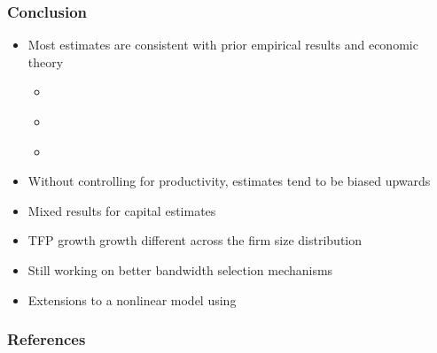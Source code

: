 \documentclass{beamer}
\begin{document}
\begin{frame}
\frametitle{Conclusion}
\begin{itemize}
	\item Most estimates are consistent with prior empirical results and economic theory
		\begin{itemize}
			\item \textcite{mert}
			\item \textcite{Holmes2008}
			\item \textcite{Rajan1999}
		\end{itemize}
	\item Without controlling for productivity, estimates tend to be biased upwards
	\item Mixed results for capital estimates
	\item TFP growth growth different across the firm size distribution
	\item Still working on better bandwidth selection mechanisms
	\item Extensions to a nonlinear model using \textcite{Arellano2016}
\end{itemize}{}
\end{frame}

\begin{frame}[allowframebreaks]
\frametitle{References}
\AtNextBibliography{\small}
\printbibliography
\end{frame}
\end{document}
